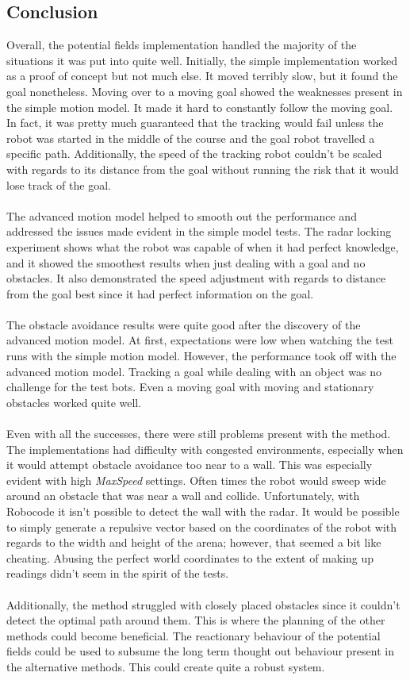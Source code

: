 \documentclass{aiaa-tc}%
\begin{document}
\subsection{Conclusion}
Overall, the potential fields implementation handled the majority of the situations it was put into quite well. Initially, the simple implementation worked as a proof of concept but not much else. It moved terribly slow, but it found the goal nonetheless. Moving over to a moving goal showed the weaknesses present in the simple motion model. It made it hard to constantly follow the moving goal. In fact, it was pretty much guaranteed that the tracking would fail unless the robot was started in the middle of the course and the goal robot travelled a specific path. Additionally, the speed of the tracking robot couldn't be scaled with regards to its distance from the goal without running the risk that it would lose track of the goal. \\ \\
The advanced motion model helped to smooth out the performance and addressed the issues made evident in the simple model tests. The radar locking experiment shows what the robot was capable of when it had perfect knowledge, and it showed the smoothest results when just dealing with a goal and no obstacles. It also demonstrated the speed adjustment with regards to distance from the goal best since it had perfect information on the goal. \\ \\
The obstacle avoidance results were quite good after the discovery of the advanced motion model. At first, expectations were low when watching the test runs with the simple motion model. However, the performance took off with the advanced motion model. Tracking a goal while dealing with an object was no challenge for the test bots. Even a moving goal with moving and stationary obstacles worked quite well. \\ \\
Even with all the successes, there were still problems present with the method. The implementations had difficulty with congested environments, especially when it would attempt obstacle avoidance too near to a wall. This was especially evident with high \emph{MaxSpeed} settings. Often times the robot would sweep wide around an obstacle that was near a wall and collide. Unfortunately, with Robocode it isn't possible to detect the wall with the radar. It would be possible to simply generate a repulsive vector based on the coordinates of the robot with regards to the width and height of the arena; however, that seemed a bit like cheating. Abusing the perfect world coordinates to the extent of making up readings didn't seem in the spirit of the tests. \\ \\
Additionally, the method struggled with closely placed obstacles since it couldn't detect the optimal path around them. This is where the planning of the other methods could become beneficial. The reactionary behaviour of the potential fields could be used to subsume the long term thought out behaviour present in the alternative methods. This could create quite a robust system.
\end{document}
